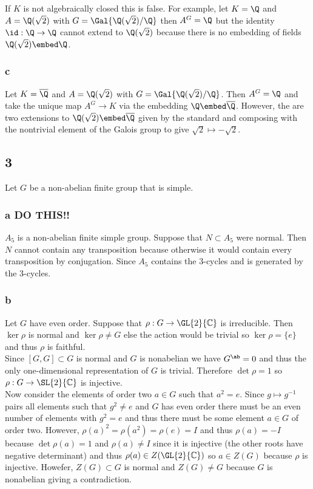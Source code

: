\documentclass[12pt]{article}
\renewcommand{\C}{\mathbb{C}}
\begin{document}
If $K$ is not algebraically closed this is false. For example, let $K = \Q$ and $A = \Q(\sqrt{2})$ with $G = \Gal{\Q(\sqrt{2})/\Q}$ then $A^G = \Q$ but the identity $\id : \Q \to \Q$ cannot extend to $\Q(\sqrt{2})$ because there is no embedding of fields $\Q(\sqrt{2}) \embed \Q$.

\subsubsection{c}

Let $K = \overline{\Q}$ and $A = \Q(\sqrt{2})$ with $G = \Gal{\Q(\sqrt{2})/\Q}$. Then $A^G = \Q$ and take the unique map $A^G \to K$ via the embedding $\Q \embed \overline{\Q}$. However, the are two extensions to $\Q(\sqrt{2}) \embed \overline{\Q}$ given by the standard and composing with the nontrivial element of the Galois group to give $\sqrt{2} \mapsto - \sqrt{2}$.

\subsection{3}

Let $G$ be a non-abelian finite group that is simple.

\subsubsection{a DO THIS!!}

$A_5$ is a non-abelian finite simple group. Suppose that $N \subset A_5$ were normal. Then $N$ cannot contain any transposition because otherwise it would contain every transposition by conjugation. Since $A_5$ contains the $3$-cycles and is generated by the $3$-cycles.

\subsubsection{b}

Let $G$ have even order. Suppose that $\rho : G \to \GL{2}{\C}$ is irreducible. Then $\ker{\rho}$ is normal and $\ker{\rho} \neq G$ else the action would be trivial so $\ker{\rho} = \{ e \}$ and thus $\rho$ is faithful. 
\bigskip\\
Since $[G, G] \subset G$ is normal and $G$ is nonabelian we have $G^\ab = 0$ and thus the only one-dimensional representation of $G$ is trivial. Therefore $\det{\rho} = 1$ so $\rho : G \to \SL{2}{\C}$ is injective. 
\bigskip\\
Now consider the elements of order two $a \in G$ such that $a^2 = e$. Since $g \mapsto g^{-1}$ pairs all elements such that $g^2 \neq e$ and $G$ has even order there must be an even number of elements with $g^2 = e$ and thus there must be some element $a \in G$ of order two. However, $\rho(a)^2 = \rho(a^2) = \rho(e) = I$ and thus $\rho(a) = - I$ because $\det{\rho(a)} = 1$ and $\rho(a) \neq I$ since it is injective (the other roots have negative determinant) and thus $\rho(a) \in Z(\GL{2}{\C})$ so $a \in Z(G)$ because $\rho$ is injective. Howefer, $Z(G) \subset G$ is normal and $Z(G) \neq G$ because $G$ is nonabelian giving a contradiction. 
\end{document}
